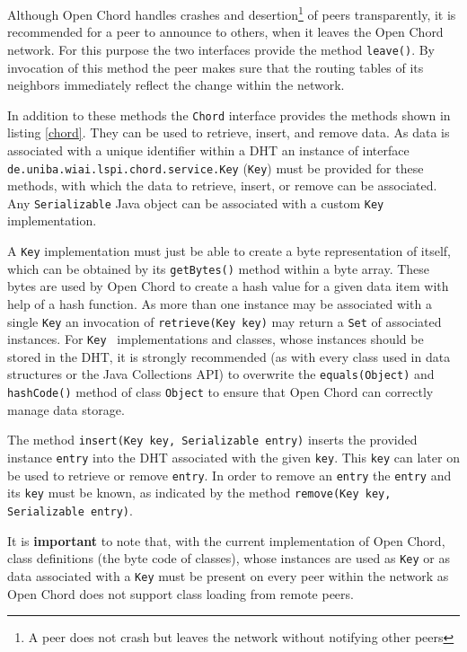 Although Open Chord handles crashes and desertion\footnote{A peer does not crash but leaves the network without notifying other peers} of peers transparently, it is 
recommended for a peer to announce to others, when it leaves the Open Chord network. 
For this purpose the two interfaces provide the method {\tt leave()}. By invocation 
of this method the peer makes sure that the routing tables of its neighbors immediately 
reflect the change within the network. 

In addition to these methods the {\tt Chord} interface provides the methods shown 
in listing \ref{chord}. They can be used to retrieve, insert, and remove 
data. As data is associated with a unique identifier within a DHT 
an instance of interface {\tt de.\-uniba.\-wiai.\-lspi.\-chord.\-service.\-Key} 
({\tt Key}) must be provided for these methods, 
with which the data to retrieve, insert, or remove can 
be associated. Any {\tt Serializable} Java object can be associated with a custom 
{\tt Key} implementation. 


A {\tt Key} implementation must just be able to create a 
byte representation of itself, which can be obtained by its {\tt getBytes()} method 
within a byte array. These bytes are used by Open Chord to create a hash value for 
a given data item with help of a hash function. As more than one instance may be 
associated with a single {\tt Key} an invocation of {\tt retrieve(Key key)} may return 
a {\tt Set} of associated instances. For {\tt Key } implementations and classes, whose 
instances should be stored in the DHT, it is strongly recommended (as with every class 
used in data structures or the Java Collections API) to overwrite the 
{\tt equals(Object)} and {\tt hashCode()} method of class {\tt Object} to ensure 
that Open Chord can correctly manage data storage. 

The method {\tt insert(Key key, Serializable entry)} inserts the provided instance 
{\tt entry} into the DHT associated with the given {\tt key}. This {\tt key} can 
later on be used to retrieve or remove {\tt entry}. In order to remove an {\tt entry}
the {\tt entry} and its {\tt key} must be known, as indicated by the method 
{\tt remove(Key key, Serializable entry)}. 

It is {\bf important} to note that, with the current implementation of Open Chord, 
class definitions (the byte code of classes), whose instances are used as {\tt Key} 
or as data associated with a {\tt Key} must be present on every peer within the 
network as Open Chord does not support class loading from remote peers. 

